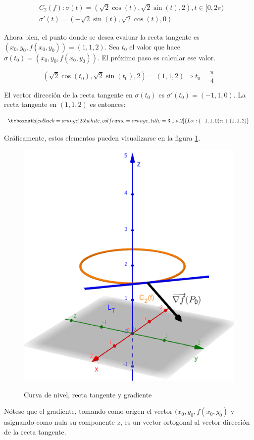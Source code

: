 \documentclass{article}
\begin{document}
\begin{subequations}
\begin{align}
& C_2(f): \sigma(t) = (\sqrt{2} \cos(t), \sqrt{2} \sin(t), 2), t \in [0, 2\pi) \\
& \sigma'(t) = (-\sqrt{2} \sin(t), \sqrt{2} \cos(t), 0)
\end{align}
\end{subequations}

Ahora bien, el punto donde se desea evaluar la recta tangente es $(x_0, y_0, f(x_0, y_0)) = (1, 1, 2)$. Sea $t_0$ el valor que hace $\sigma(t_0) = (x_0, y_0, f(x_0, y_0))$. El próximo paso es calcular ese valor.

\begin{equation}
(\sqrt{2} \cos(t_0), \sqrt{2} \sin(t_0), 2) = (1, 1, 2) \Rightarrow t_0 = \frac{\pi}{4}
\end{equation}

El vector dirección de la recta tangente en $\sigma(t_0)$ es $\sigma'(t_0) = (-1, 1, 0)$. La recta tangente en $(1, 1, 2)$ es entonces:

\begin{equation}
\tcboxmath[colback=orange!25!white,colframe=orange,title=3.1.a.2]
{
L_T: (-1, 1, 0) \alpha + (1, 1, 2)
}
\end{equation}

Gráficamente, estos elementos pueden visualizarse en la figura \ref{fig:1-a-2}.

\begin{figure}[ht]
\caption{Curva de nivel, recta tangente y gradiente}
\includegraphics[scale=0.5]{img/ejercicios/3/1-a-2.png} 
\centering
\label{fig:1-a-2}
\end{figure}

Nótese que el gradiente, tomando como origen el vector $(x_0, y_0, f(x_0, y_0)$ y asignando como nula su componente $z$, es un vector ortogonal al vector dirección de la recta tangente.
\end{document}

